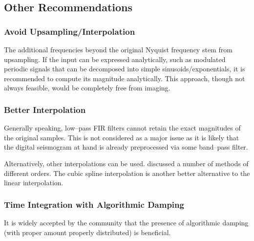 \subsection{Other Recommendations}
\subsubsection{Avoid Upsampling/Interpolation}
The additional frequencies beyond the original Nyquist frequency stem from upsampling. If the input can be expressed analytically, such as modulated periodic signals that can be decomposed into simple sinusoids/exponentials, it is recommended to compute its magnitude analytically. This approach, though not always feasible, would be completely free from imaging.
\subsubsection{Better Interpolation}
Generally speaking, low--pass FIR filters cannot retain the exact magnitudes of the original samples. This is not considered as a major issue as it is likely that the digital seismogram at hand is already preprocessed via some band--pass filter.

Alternatively, other interpolations can be used. \citet{Lee1989} discussed a number of methods of different orders. The cubic spline interpolation \citep[see][\S~3.5]{Burden2011} is another better alternative to the linear interpolation.
\subsubsection{Time Integration with Algorithmic Damping}\label{sec:algo_damping}
It is widely accepted by the community that the presence of algorithmic damping (with proper amount properly distributed) is beneficial.

